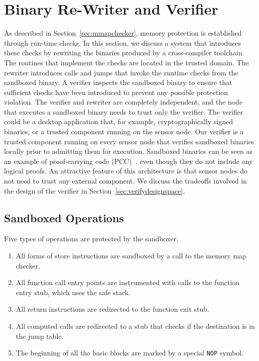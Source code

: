 \section{Binary Re-Writer and Verifier}
\label{sec:writeverify}
%
As described in Section~\ref{sec:mmapchecker}, memory protection is
established through run-time checks. 
%
In this section, we discuss a system that introduces these checks by
rewriting the binaries produced by a cross-compiler toolchain.
%
The routines that implement the checks are located in the trusted
domain.
%
The rewriter introduces calls and jumps that invoke the runtime
checks from the sandboxed binary.
%
A verifier inspects the sandboxed binary to ensure that sufficient
checks have been introduced to prevent any possible protection
violation.
%
The verifier and rewriter are completely independent, and
%
the node that executes a sandboxed binary needs to trust only the
verifier.
%
The verifier could be a desktop application that, for example,
cryptographically signed binaries, or a trusted component running on the
sensor node.
%
%
%
Our verifier is a trusted component running on every sensor
node that verifies sandboxed binaries locally prior to admitting them
for execution.
%
Sandboxed binaries can be seen as an example of proof-carrying code
(PCC)~\cite{necula96pcc}, even though they do not include any logical
proofs.
%
An attractive feature of this architecture is that sensor nodes do not
need to trust any external component.
%
We discuss the tradeoffs involved in the design of the verifier in
Section~\ref{sec:verifydesignspace}.
%
\subsection{Sandboxed Operations}
%
Five types of operations are protected by the sandboxer.
%
\begin{enumerate}
%
\item{All forms of store instructions are sandboxed by a call to the
memory map checker.}
%
\item{All function call entry points are instrumented with calls to
the function entry stub, which uses the safe stack.}
%
\item{All return instructions are redirected to the function exit stub.}
%
\item{All computed calls are redirected to a stub that checks if
the destination is in the jump table.} 
%
\item{The beginning of all the basic blocks are marked by a special
\texttt{NOP} symbol.}
%
\end{enumerate}

